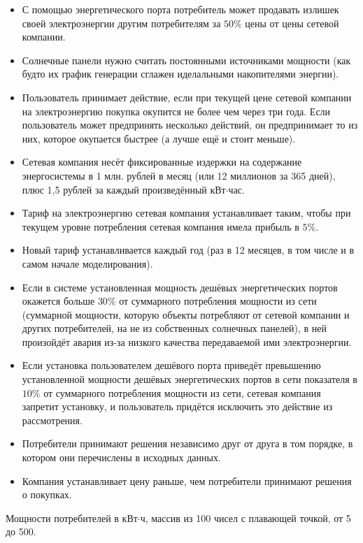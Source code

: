 \begin{itemize}
    \item С помощью энергетического порта потребитель может продавать излишек своей электроэнергии другим потребителям за $50\%$ цены от цены сетевой компании.
    \item Солнечные панели нужно считать постоянными источниками мощности (как будто их график генерации сглажен иделальными накопителями энергии).
    \item Пользователь принимает действие, если при текущей цене сетевой компании на электроэнергию покупка окупится не более чем через три года. Если пользователь может предпринять несколько действий, он предпринимает то из них, которое окупается быстрее (а лучше ещё и стоит меньше).
    \item Сетевая компания несёт фиксированные издержки на содержание энергосистемы в 1 млн. рублей в месяц (или 12 миллионов за 365 дней), плюс 1,5 рублей за каждый произведённый кВт$\cdot$час.
    \item Тариф на электроэнергию сетевая компания устанавливает таким, чтобы при текущем уровне потребления сетевая компания имела прибыль в $5\%$.
    \item Новый тариф устанавливается каждый год (раз в 12 месяцев, в том числе и в самом начале моделирования).
    \item Если в системе установленная мощность дешёвых энергетических портов окажется больше $30\%$ от суммарного потребления мощности из сети (суммарной мощности, которую объекты потребляют от сетевой компании и других потребителей, на не из собственных солнечных панелей), в ней произойдёт авария из-за низкого качества передаваемой ими электроэнергии.
    \item Если установка пользователем дешёвого порта приведёт превышению установленной мощности дешёвых энергетических портов в сети показателя в $10\%$ от суммарного потребления мощности из сети, сетевая компания запретит установку, и пользователь придётся исключить это действие из рассмотрения.
    \item Потребители принимают решения независимо друг от друга в том порядке, в котором они перечислены в исходных данных.
    \item Компания устанавливает цену раньше, чем потребители принимают решения о покупках.
\end{itemize}


Мощности потребителей в кВт$\cdot$ч, массив из 100 чисел с плавающей точкой, от 5 до 500.

